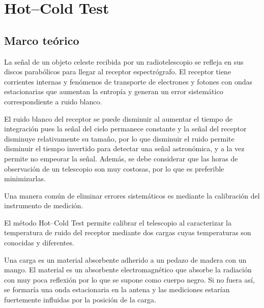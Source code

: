 \section{Hot--Cold Test}\label{sec:hotcoldtest}

\subsection{Marco teórico}

La señal de un objeto celeste recibida por un radiotelescopio se refleja en sus discos parabólicos para llegar al receptor espectrógrafo. El receptor tiene corrientes internas y fenómenos de transporte de electrones y fotones con ondas estacionarias que aumentan la entropía y generan un error sistemático correspondiente a ruido blanco.

El ruido blanco del receptor se puede disminuir al aumentar el tiempo de integración pues la señal del cielo permanece constante y la señal del receptor disminuye relativamente su tamaño, por lo que disminuir el ruido permite disminuir el tiempo invertido para detectar una señal astronómica, y a la vez permite no empeorar la señal. Además, se debe considerar que las horas de observación de un telescopio son muy costosas, por lo que es preferible minimizarlas.

Una manera común de eliminar errores sistemáticos es mediante la calibración del instrumento de medición.

El método Hot--Cold Test permite calibrar el telescopio al caracterizar la temperatura de ruido del receptor mediante dos cargas cuyas temperaturas son conocidas y diferentes.

Una carga es un material absorbente adherido a un pedazo de madera con un mango. El material es un absorbente electromagnético que absorbe la radiación con muy poca reflexión por lo que se supone como cuerpo negro. Si no fuera así, se formaría una onda estacionaria en la antena y las mediciones estarían fuertemente influidas por la posición de la carga.


